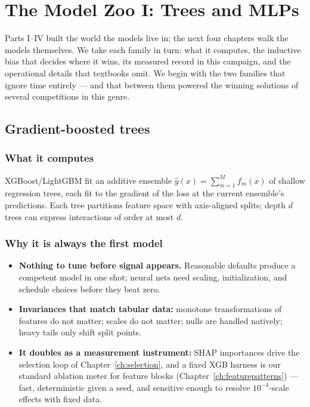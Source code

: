 \chapter{The Model Zoo I: Trees and MLPs}
\label{ch:treesmlp}

Parts I--IV built the world the models live in; the next four chapters walk
the models themselves. We take each family in turn: what it computes, the
inductive bias that decides where it wins, its measured record in this
campaign, and the operational details that textbooks omit. We begin with
the two families that ignore time entirely --- and that between them
powered the winning solutions of several competitions in this genre.

\section{Gradient-boosted trees}

\subsection{What it computes}

XGBoost/LightGBM fit an additive ensemble
$\hat y(x) = \sum_{m=1}^{M} f_m(x)$ of shallow regression trees, each fit
to the gradient of the loss at the current ensemble's predictions. Each
tree partitions feature space with axis-aligned splits; depth $d$ trees can
express interactions of order at most $d$.

\subsection{Why it is always the first model}

\begin{itemize}
\item \textbf{Nothing to tune before signal appears.} Reasonable defaults
  produce a competent model in one shot; neural nets need scaling,
  initialization, and schedule choices before they beat zero.
\item \textbf{Invariances that match tabular data:} monotone
  transformations of features do not matter; scales do not matter; nulls
  are handled natively; heavy tails only shift split points.
\item \textbf{It doubles as a measurement instrument:} SHAP importances
  drive the selection loop of Chapter~\ref{ch:selection}, and a fixed XGB
  harness is our standard ablation meter for feature blocks
  (Chapter~\ref{ch:featurepatterns}) --- fast, deterministic given a seed,
  and sensitive enough to resolve $10^{-4}$-scale effects with fixed data.
\end{itemize}

